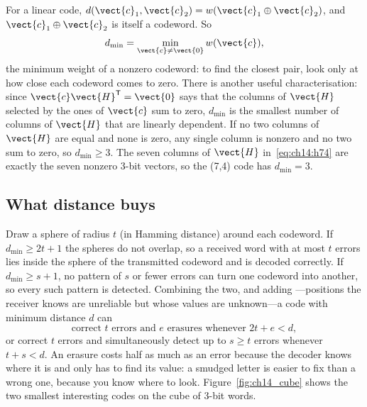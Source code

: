 For a linear code, $d(\vect{c}_1,\vect{c}_2)=w(\vect{c}_1\oplus\vect{c}_2)$, and
$\vect{c}_1\oplus\vect{c}_2$ is itself a codeword. So
\begin{equation}
d_{\min}=\min_{\vect{c}\ne\vect{0}} w(\vect{c}),
\end{equation}
the minimum weight of a nonzero codeword: to find the closest pair, look only at how close each
codeword comes to zero. There is another useful characterisation: since
$\vect{c}\vect{H}^{\mathsf T}=\vect{0}$ says that the columns of $\vect{H}$ selected by the ones
of $\vect{c}$ sum to zero, $d_{\min}$ is the smallest number of columns of $\vect{H}$ that are
linearly dependent. If no two columns of $\vect{H}$ are equal and none is zero, any single column
is nonzero and no two sum to zero, so $d_{\min}\ge3$. The seven columns of $\vect{H}$
in~\eqref{eq:ch14:h74} are exactly the seven nonzero 3-bit vectors, so the (7,4) code has
$d_{\min}=3$.

\subsection{What distance buys}

Draw a sphere of radius $t$ (in Hamming distance) around each codeword. If $d_{\min}\ge2t+1$ the
spheres do not overlap, so a received word with at most $t$ errors lies inside the sphere of the
transmitted codeword and is decoded correctly. If $d_{\min}\ge s+1$, no pattern of $s$ or fewer
errors can turn one codeword into another, so every such pattern is detected. Combining the two,
and adding ---positions the receiver knows are unreliable but whose values are
unknown---a code with minimum distance $d$ can
\begin{equation}
\text{correct } t \text{ errors and } e \text{ erasures whenever } 2t+e<d,
\label{eq:ch14:errera}
\end{equation}
or correct $t$ errors and simultaneously detect up to $s\ge t$ errors whenever $t+s<d$.
An erasure costs half as much as an error because the decoder knows where it is and only has to
find its value: a smudged letter is easier to fix than a wrong one, because you know where to look.
Figure~\ref{fig:ch14_cube} shows the two smallest interesting codes on the cube of 3-bit words.


